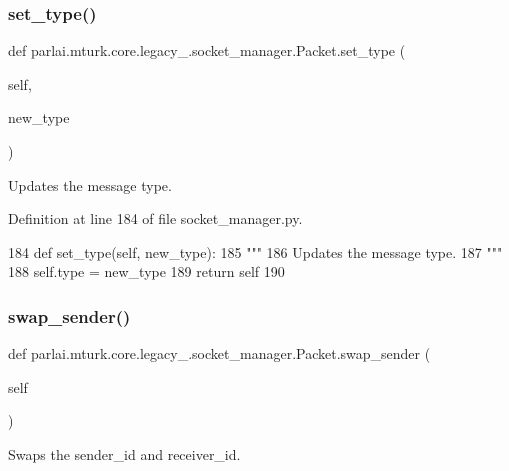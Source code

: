 \subsubsection{\texorpdfstring{set\+\_\+type()}{set\_type()}}
{\footnotesize\ttfamily def parlai.\+mturk.\+core.\+legacy\+\_.\+socket\+\_\+manager.\+Packet.\+set\+\_\+type (\begin{DoxyParamCaption}\item[{}]{self,  }\item[{}]{new\+\_\+type }\end{DoxyParamCaption})}

\begin{DoxyVerb}Updates the message type.
\end{DoxyVerb}
 

Definition at line 184 of file socket\+\_\+manager.\+py.


\begin{DoxyCode}
184     \textcolor{keyword}{def }set\_type(self, new\_type):
185         \textcolor{stringliteral}{"""}
186 \textcolor{stringliteral}{        Updates the message type.}
187 \textcolor{stringliteral}{        """}
188         self.type = new\_type
189         \textcolor{keywordflow}{return} self
190 
\end{DoxyCode}
\mbox{\label{classparlai_1_1mturk_1_1core_1_1legacy__2018_1_1socket__manager_1_1Packet_ab8d13db3d0ac97cb33114593eb47d054}} 
\subsubsection{\texorpdfstring{swap\+\_\+sender()}{swap\_sender()}}
{\footnotesize\ttfamily def parlai.\+mturk.\+core.\+legacy\+\_.\+socket\+\_\+manager.\+Packet.\+swap\+\_\+sender (\begin{DoxyParamCaption}\item[{}]{self }\end{DoxyParamCaption})}

\begin{DoxyVerb}Swaps the sender_id and receiver_id.
\end{DoxyVerb}
 

